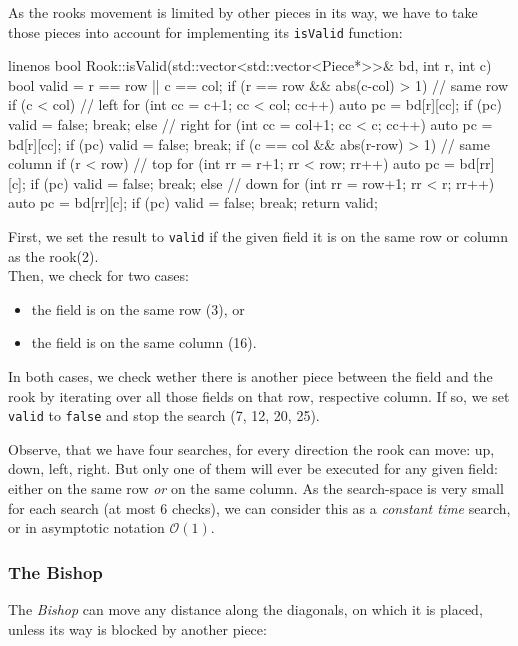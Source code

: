 As the rooks movement is limited by other pieces in its way, we have to take those pieces
into account for implementing its \texttt{isValid} function:

\begin{cpp*}{linenos}
bool Rook::isValid(std::vector<std::vector<Piece*>>& bd, int r, int c) {
  bool valid = r == row || c == col;
  if (r == row && abs(c-col) > 1) { // same row
    if (c < col) { // left
      for (int cc = c+1; cc < col; cc++) {
        auto pc = bd[r][cc];
        if (pc) { valid = false; break; }
      }
    } else { // right
      for (int cc = col+1; cc < c; cc++) {
        auto pc = bd[r][cc];
        if (pc) { valid = false; break; }
      }
    }
  }
  if (c == col && abs(r-row) > 1) { // same column
    if (r < row) { // top
      for (int rr = r+1; rr < row; rr++) {
        auto pc = bd[rr][c];
        if (pc) { valid = false; break; }
      }
    } else { // down
      for (int rr = row+1; rr < r; rr++) {
        auto pc = bd[rr][c];
        if (pc) { valid = false; break; }
      }
    }
  }
  return valid;
}
\end{cpp*}

First, we set the result to \texttt{valid} if the given field it is on the same row
or column as the rook(2).\\
Then, we check for two cases:
\begin{itemize}
  \item the field is on the same row (3), or
  \item the field is on the same column (16).
\end{itemize}

In both cases, we check wether there is another piece between the field and the rook by
iterating over all those fields on that row, respective column.
If so, we set \texttt{valid} to \texttt{false} and stop the search (7, 12, 20, 25).

Observe, that we have four searches, for every direction the rook can move: up, down, left, right.
But only one of them will ever be executed for any given field: either on the same row \emph{or}
on the same column.
As the search-space is very small for each search (at most 6 checks), we can consider this as a
\emph{constant time} search, or in asymptotic notation $\mathcal{O}(1)$.

\subsubsection{The Bishop}
The \emph{Bishop} can move any distance along the diagonals, on which it is placed,
unless its way is blocked by another piece:

